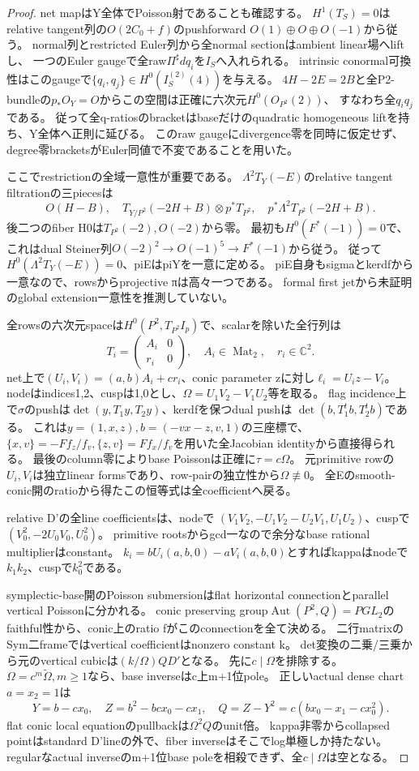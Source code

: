 \documentclass[a4paper,11pt]{ltjsarticle}
\theoremstyle{definition}
\begin{document}
\begin{proof}
net mapはY全体でPoisson射であることも確認する。
$H^1(T_S)=0$はrelative tangent列の$O(2C_0+f)$のpushforward
$O(1)\oplus O\oplus O(-1)$から従う。
normal列とrestricted Euler列から全normal sectionはambient linear場へliftし、
一つのEuler gaugeで全raw$\Pi^\sharp dq_i$を$I_S$へ入れられる。
intrinsic conormal可換性はこのgaugeで$\{q_i,q_j\}\in H^0(I_S^{(2)}(4))$を与える。
$4H-2E=2B$と全P2-bundleの$p_*O_Y=O$からこの空間は正確に六次元$H^0(O_{P^2}(2))$、
すなわち全$q_iq_j$である。
従って全q-ratiosのbracketはbaseだけのquadratic homogeneous liftを持ち、Y全体へ正則に延びる。
このraw gaugeにdivergence零を同時に仮定せず、degree零bracketsがEuler同値で不変であることを用いた。

ここでrestrictionの全域一意性が重要である。
$\Lambda^2T_Y(-E)$のrelative tangent filtrationの三piecesは
\[
 O(H-B),\quad T_{Y/P^2}(-2H+B)\otimes p^*T_{P^2},\quad
 p^*\Lambda^2T_{P^2}(-2H+B).
\]
後二つのfiber H0は$T_{P^2}(-2),O(-2)$から零。
最初も$H^0(F^*(-1))=0$で、これはdual Steiner列$O(-2)^2\to O(-1)^5\to F^*(-1)$から従う。
従って$H^0(\Lambda^2T_Y(-E))=0$、piEはpiYを一意に定める。
piE自身もsigmaとkerdfから一意なので、rowsからprojective πは高々一つである。
formal first jetから未証明のglobal extension一意性を推測していない。

全rowsの六次元spaceは$H^0(P^2,T_{P^2}I_p)$で、scalarを除いた全行列は
\[
 T_i=\begin{pmatrix}A_i&0\\r_i&0\end{pmatrix},\quad A_i\in\operatorname{Mat}_2,\quad r_i\in\mathbb C^2.
\]
net上で$(U_i,V_i)=(a,b)A_i+cr_i$、conic parameter zに対し$\ell_i=U_i z-V_i$。
nodeはindices1,2、cuspは1,0とし、$\Omega=U_1V_2-V_1U_2$等を取る。
flag incidence上で$\sigma$のpushは$\det(y,T_1y,T_2y)$、kerdfを保つdual pushは
$\det(b,T_1^tb,T_2^tb)$である。
これは$y=(1,x,z),b=(-vx-z,v,1)$の三座標で、
$\{x,v\}=-Ff_z/f_v,\{z,v\}=Ff_x/f_v$を用いた全Jacobian identityから直接得られる。
最後のcolumn零によりbase Poissonは正確に$\tau=c\Omega$。
元primitive rowの$U_i,V_i$は独立linear formsであり、row-pairの独立性から$\Omega\not\equiv0$。
全Eのsmooth-conic開のratioから得たこの恒等式は全coefficientへ戻る。

relative D'の全line coefficientsは、nodeで
$(V_1V_2,-U_1V_2-U_2V_1,U_1U_2)$、cuspで$(V_0^2,-2U_0V_0,U_0^2)$。
primitive rootsからgcd一なので余分なbase rational multiplierはconstant。
$k_i=bU_i(a,b,0)-aV_i(a,b,0)$とすればkappaはnodeで$k_1k_2$、cuspで$k_0^2$である。

symplectic-base開のPoisson submersionはflat horizontal connectionとparallel vertical Poissonに分かれる。
conic preserving group$\operatorname{Aut}(P^2,Q)=PGL_2$のfaithful性から、conic上のratio fがこのconnectionを全て決める。
二行matrixのSym二frameではvertical coefficientはnonzero constant k。
det変換の二乗/三乗から元のvertical cubicは$(k/\Omega)Q D'$となる。
先に$c\mid\Omega$を排除する。$\Omega=c^m\widetilde\Omega,m\ge1$なら、base inverseはc上m+1位pole。
正しいactual dense chart$a=x_2=1$は
\[
 Y=b-cx_0,\quad Z=b^2-bcx_0-cx_1,\quad
 Q=Z-Y^2=c(bx_0-x_1-cx_0^2).
\]
flat conic local equationのpullbackは$\Omega^2Q$のunit倍。
kappa非零からcollapsed pointはstandard D'lineの外で、fiber inverseはそこでlog単極しか持たない。
regularなactual inverseのm+1位base poleを相殺できず、全$c\mid\Omega$は空となる。


\end{proof}
\end{document}
